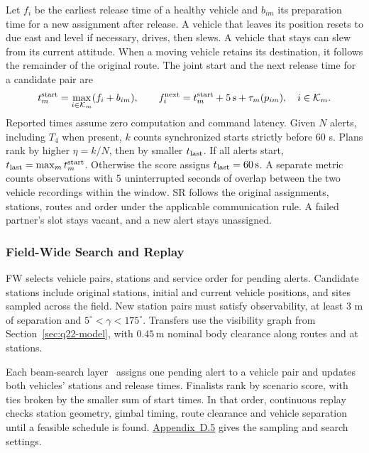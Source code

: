 \documentclass{swmcmthesis}
\begin{document}
Let \(f_i\) be the earliest release time of a healthy vehicle and \(b_{im}\) its preparation time for a new assignment after release. A vehicle that leaves its position resets to due east and level if necessary, drives, then slews. A vehicle that stays can slew from its current attitude. When a moving vehicle retains its destination, it follows the remainder of the original route. The joint start and the next release time for a candidate pair are
\begin{equation}
\label{eq:q4-dispatch-times}
t_m^{\rm start}=\max_{i\in\mathcal K_m}(f_i+b_{im}),\qquad
f_i^{\rm next}=t_m^{\rm start}+5\,\mathrm s+\tau_m(p_{im}),\quad i\in\mathcal K_m.
\end{equation}
Reported times assume zero computation and command latency. Given \(N\) alerts, including \(T_4\) when present, \(k\) counts synchronized starts strictly before 60 s. Plans rank by higher \(\eta=k/N\), then by smaller \(t_{\rm last}\). If all alerts start, \(t_{\rm last}=\max_m t_m^{\rm start}\). Otherwise the score assigns \(t_{\rm last}=60\,\mathrm s\). A separate metric counts observations with 5 uninterrupted seconds of overlap between the two vehicle recordings within the window. SR follows the original assignments, stations, routes and order under the applicable communication rule. A failed partner's slot stays vacant, and a new alert stays unassigned.

\subsubsection{Field-Wide Search and Replay}

FW selects vehicle pairs, stations and service order for pending alerts. Candidate stations include original stations, initial and current vehicle positions, and sites sampled across the field. New station pairs must satisfy observability, at least 3 m of separation and \(5^\circ<\gamma<175^\circ\). Transfers use the visibility graph from Section~\ref{sec:q22-model}, with \(0.45\,\mathrm m\) nominal body clearance along routes and at stations.

Each beam-search layer~\cite{ref:beam-search} assigns one pending alert to a vehicle pair and updates both vehicles' stations and release times. Finalists rank by scenario score, with ties broken by the smaller sum of start times. In that order, continuous replay checks station geometry, gimbal timing, route clearance and vehicle separation until a feasible schedule is found. \hyperref[app:q4-search-settings]{Appendix~D.5} gives the sampling and search settings.
\end{document}
